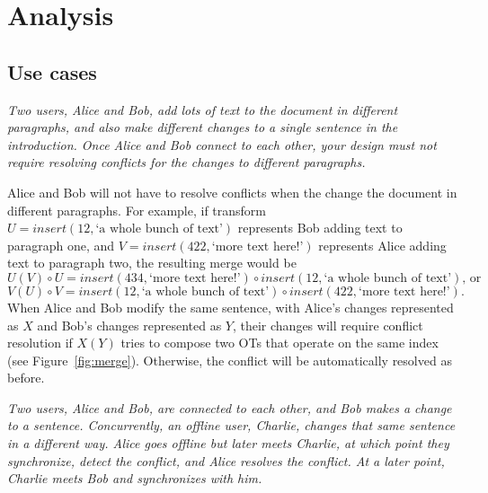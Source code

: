 \documentclass[11pt,titlepage]{article}
\begin{document}
\section{Analysis}

\subsection{Use cases}

\emph{Two users, Alice and Bob, add lots of text to the document in
  different paragraphs, and also make different changes to a single
  sentence in the introduction. Once Alice and Bob connect to each
  other, your design must not require resolving conflicts for the
  changes to different paragraphs.}

\vspace{5mm}

Alice and Bob will not have to resolve conflicts when the change the
document in different paragraphs. For example, if transform $U =
insert(12, \text{`a whole bunch of text'})$ represents Bob adding text
to paragraph one, and $V = insert(422, \text{`more text here!'})$
represents Alice adding text to paragraph two, the resulting merge
would be
\begin{equation*}
  U(V)\circ U = insert(434, \text{`more text
    here!'})\circ insert(12, \text{`a whole bunch of text'})\text{, or}
\end{equation*}
\begin{equation*}
  V(U)\circ V = insert(12, \text{`a whole bunch of text'})\circ
  insert(422, \text{`more text here!'}).
\end{equation*}
When Alice and Bob modify the same sentence, with Alice's changes
represented as $X$ and Bob's changes represented as $Y$, their changes
will require conflict resolution if $X(Y)$ tries to compose two OTs
that operate on the same index (see
Figure~\ref{fig:merge}). Otherwise, the conflict will be automatically
resolved as before.

\vspace{5mm}
\noindent
\emph{Two users, Alice and Bob, are connected to each other, and Bob
  makes a change to a sentence. Concurrently, an offline user,
  Charlie, changes that same sentence in a different way. Alice goes
  offline but later meets Charlie, at which point they synchronize,
  detect the conflict, and Alice resolves the conflict. At a later
  point, Charlie meets Bob and synchronizes with him.}

\vspace{5mm}
\end{document}
